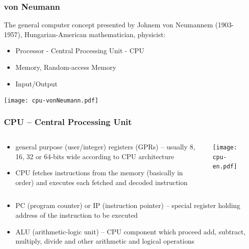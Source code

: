 \documentclass{beamer}
\begin{document}
\begin{frame}
\frametitle{von Neumann}

The general computer concept presented by Johnem von Neumannem (1903-1957), Hungarian-American mathematician, physicist:
\begin{itemize}
\item Processor - Central Processing Unit - CPU
\item Memory, Random-access Memory
\item Input/Output
\end{itemize}
\begin{center}
   \texttt{[image: cpu-vonNeumann.pdf]}
\end{center}

\end{frame}


\begin{frame}
\frametitle{CPU -- Central Processing Unit}
\begin{columns}
\begin{column}{0.50\textwidth}
\begin{itemize}
\item general purpose (user/integer) registers (GPRs) -- usually 8, 16, 32 or 64-bits wide according to CPU architecture
\item CPU fetches instructions from the memory (basically in order) and executes each fetched and decoded instruction
\end{itemize}
\end{column}
\begin{column}{0.50\textwidth}  
\begin{center}
   \texttt{[image: cpu-en.pdf]}
\end{center}
\end{column}
\end{columns}
\begin{itemize}
\item PC (program counter) or IP (instruction pointer) -- special register holding address of the instruction to be executed
\item ALU (arithmetic-logic unit) -- CPU component which proceed add, subtract, multiply, divide and other arithmetic and logical operations
\end{itemize}

\end{frame}
\end{document}
